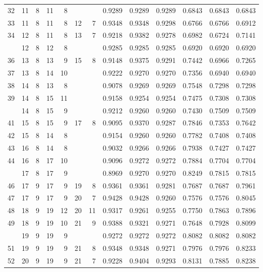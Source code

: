 \begin{Schunk}
\begin{longtable}{rrrrrrrrrrrrr}
32 & 11 & 8 & 11 & 8 &  &  & 0.9289 & 0.9289 & 0.9289 & 0.6843 & 0.6843 & 0.6843\\
33 & 11 & 8 & 11 & 8 & 12 & 7 & 0.9348 & 0.9348 & 0.9298 & 0.6766 & 0.6766 & 0.6912\\
34 & 12 & 8 & 11 & 8 & 13 & 7 & 0.9218 & 0.9382 & 0.9278 & 0.6982 & 0.6724 & 0.7141\\
\addlinespace
35 & 12 & 8 & 12 & 8 &  &  & 0.9285 & 0.9285 & 0.9285 & 0.6920 & 0.6920 & 0.6920\\
36 & 13 & 8 & 13 & 9 & 15 & 8 & 0.9148 & 0.9375 & 0.9291 & 0.7442 & 0.6966 & 0.7265\\
37 & 13 & 8 & 14 & 10 &  &  & 0.9222 & 0.9270 & 0.9270 & 0.7356 & 0.6940 & 0.6940\\
38 & 14 & 8 & 13 & 8 &  &  & 0.9078 & 0.9269 & 0.9269 & 0.7548 & 0.7298 & 0.7298\\
39 & 14 & 8 & 15 & 11 &  &  & 0.9158 & 0.9254 & 0.9254 & 0.7475 & 0.7308 & 0.7308\\
\addlinespace
40 & 14 & 8 & 15 & 9 &  &  & 0.9212 & 0.9260 & 0.9260 & 0.7430 & 0.7509 & 0.7509\\
41 & 15 & 8 & 15 & 9 & 17 & 8 & 0.9095 & 0.9370 & 0.9287 & 0.7846 & 0.7353 & 0.7642\\
42 & 15 & 8 & 14 & 8 &  &  & 0.9154 & 0.9260 & 0.9260 & 0.7782 & 0.7408 & 0.7408\\
43 & 16 & 8 & 14 & 8 &  &  & 0.9032 & 0.9266 & 0.9266 & 0.7938 & 0.7427 & 0.7427\\
44 & 16 & 8 & 17 & 10 &  &  & 0.9096 & 0.9272 & 0.9272 & 0.7884 & 0.7704 & 0.7704\\
\addlinespace
45 & 17 & 8 & 17 & 9 &  &  & 0.8969 & 0.9270 & 0.9270 & 0.8249 & 0.7815 & 0.7815\\
46 & 17 & 9 & 17 & 9 & 19 & 8 & 0.9361 & 0.9361 & 0.9281 & 0.7687 & 0.7687 & 0.7961\\
47 & 17 & 9 & 17 & 9 & 20 & 7 & 0.9428 & 0.9428 & 0.9260 & 0.7576 & 0.7576 & 0.8045\\
48 & 18 & 9 & 19 & 12 & 20 & 11 & 0.9317 & 0.9261 & 0.9255 & 0.7750 & 0.7863 & 0.7896\\
49 & 18 & 9 & 19 & 10 & 21 & 9 & 0.9388 & 0.9321 & 0.9271 & 0.7648 & 0.7928 & 0.8099\\
\addlinespace
50 & 19 & 9 & 19 & 9 &  &  & 0.9272 & 0.9272 & 0.9272 & 0.8082 & 0.8082 & 0.8082\\
51 & 19 & 9 & 19 & 9 & 21 & 8 & 0.9348 & 0.9348 & 0.9271 & 0.7976 & 0.7976 & 0.8233\\
52 & 20 & 9 & 19 & 9 & 21 & 7 & 0.9228 & 0.9404 & 0.9293 & 0.8131 & 0.7885 & 0.8238\\

\end{longtable}
\end{Schunk}
